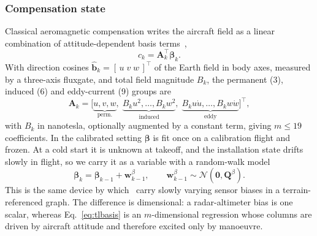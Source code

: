 \documentclass{IEEEtaes}
\begin{document}
\subsubsection{Compensation state}
Classical aeromagnetic compensation writes the aircraft field as a linear
combination of attitude-dependent basis
terms~\cite{tolles1950,leliak1961,bickel1979},
\begin{equation}
c_k=\mathbf{A}_k^{\top}\boldsymbol{\beta}_k .
\label{eq:tl}
\end{equation}
With direction cosines $\hat{\mathbf{b}}_k=[\,u\;v\;w\,]^{\top}$ of the Earth
field in body axes, measured by a three-axis fluxgate, and total field magnitude
$B_k$, the permanent (3), induced (6) and eddy-current (9) groups are
\begin{equation}
\mathbf{A}_k=\big[\underbrace{u,v,w}_{\text{perm.}},\;
\underbrace{B_ku^2,\dots,B_kw^2}_{\text{induced}},\;
\underbrace{B_ku\dot u,\dots,B_kw\dot w}_{\text{eddy}}\big]^{\top},
\label{eq:tlbasis}
\end{equation}
with $B_k$ in nanotesla, optionally augmented by a constant term, giving $m\le19$ coefficients.
In the calibrated setting $\boldsymbol{\beta}$ is fit once on a calibration
flight and frozen. At a cold start it is unknown at takeoff, and the
installation state drifts slowly in flight, so we carry it as a variable with a
random-walk model
\begin{equation}
\boldsymbol{\beta}_{k}=\boldsymbol{\beta}_{k-1}+\mathbf{w}^{\beta}_{k-1},
\qquad \mathbf{w}^{\beta}_{k-1}\sim\mathcal{N}(\mathbf{0},\mathbf{Q}^{\beta}).
\label{eq:betawalk}
\end{equation}
This is the same device by which~\cite{park2023,park2024} carry slowly varying
sensor biases in a terrain-referenced graph. The difference is dimensional: a
radar-altimeter bias is one scalar, whereas Eq.~\eqref{eq:tlbasis} is an
$m$-dimensional regression whose columns are driven by aircraft attitude and
therefore excited only by manoeuvre.
\end{document}
